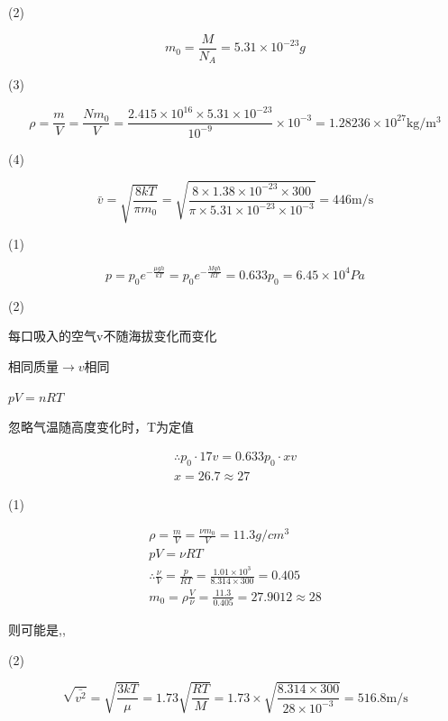 \documentclass[b5paper,opensource]{./template/qyxf-book}
\begin{document}
(2)

$$
m _ { 0 } = \frac { M } { N _ { A } } = 5.31 \times 10 ^ { - 23 } g
$$

(3)

$$
\rho = \frac { m } { V } = \frac { N m _ { 0 } } { V } = \frac { 2.415 \times 10 ^ { 16 } \times 5.31 \times 10 ^ { - 23 } } { 10 ^ { - 9 } } \times 10 ^ { - 3 } = 1.28236 \times 10 ^ { 27 } \mathrm { kg } / \mathrm { m } ^ { 3 }
$$

(4)

$$
\bar { v } = \sqrt { \frac { 8 k T } { \pi m _ { 0 } } } = \sqrt { \frac { 8 \times 1.38 \times 10 ^ { - 23 } \times 300 } { \pi \times 5.31 \times 10 ^ { - 23 } \times 10 ^ { - 3 } } } = 446 \mathrm { m } / \mathrm { s }
$$



\solve

(1)

$$
p = p _ { 0 } e ^ { - \frac { \mu g h } { k T } } = p _ { 0 } e ^ { - \frac { M g h } { R T } } = 0.633 p _ { 0 } = 6.45 \times 10 ^ { 4 } P a
$$

(2)

每口吸入的空气v不随海拔变化而变化

相同质量$\rightarrow v $相同

$pV=nRT$

忽略气温随高度变化时，T为定值

$$
\begin{array}{l}
\therefore p_{0}\cdot 17 v =0.633p_0 \cdot x v\\
{ x = 26.7 \approx 27} 
\end{array}
$$


\solve

(1)

$$
\begin{array} { c } { \rho = \frac { m } { V } = \frac { \nu m _ { 0 } } { V } = 11.3 g / c m ^ { 3 } } \\ { p V = \nu R T } \\ { \therefore \frac { \nu } { V } = \frac { p } { R T } = \frac { 1.01 \times 10 ^ { 3 } } { 8.314 \times 300 } = 0.405 } \\ { m _ { 0 } = \rho \frac { V } { \nu } = \frac { 11.3 } { 0.405 } = 27.9012 \approx 28 } \end{array}
$$

则可能是,,

(2)

$$
\sqrt{\bar{v^{2}}}=\sqrt {\frac{3kT}{\mu}}=1.73\sqrt {\frac{RT}{M}}=1.73\times\sqrt{\frac{8.314\times 300}{28\times10^{-3}}}=516.8\mathrm{m}/\mathrm{s}
$$
\end{document}
